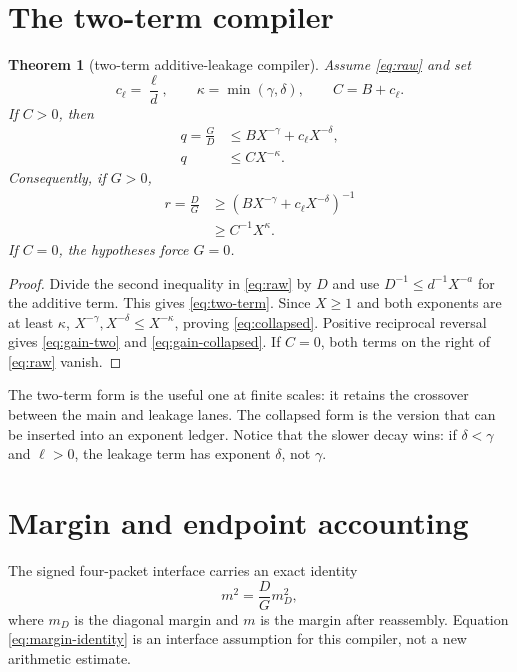 \documentclass[11pt]{article}
\newtheorem{theorem}{Theorem}
\begin{document}
\section{The two-term compiler}

\begin{theorem}[two-term additive-leakage compiler]
Assume \eqref{eq:raw} and set
\[
 c_\ell=\frac\ell d,\qquad \kappa=\min(\gamma,\delta),
 \qquad C=B+c_\ell.
\]
If $C>0$, then
\begin{align}
 q=\frac GD&\le B X^{-\gamma}+c_\ell X^{-\delta},
 \label{eq:two-term}\\
 q&\le C X^{-\kappa}.
 \label{eq:collapsed}
\end{align}
Consequently, if $G>0$,
\begin{align}
 r=\frac DG&\ge
 \left(B X^{-\gamma}+c_\ell X^{-\delta}\right)^{-1}
 \label{eq:gain-two}\\
 &\ge C^{-1}X^\kappa.
 \label{eq:gain-collapsed}
\end{align}
If $C=0$, the hypotheses force $G=0$.
\end{theorem}

\begin{proof}
Divide the second inequality in \eqref{eq:raw} by $D$ and use
$D^{-1}\le d^{-1}X^{-a}$ for the additive term.  This gives
\eqref{eq:two-term}.  Since $X\ge1$ and both exponents are at least
$\kappa$, $X^{-\gamma},X^{-\delta}\le X^{-\kappa}$, proving
\eqref{eq:collapsed}.  Positive reciprocal reversal gives
\eqref{eq:gain-two} and \eqref{eq:gain-collapsed}.  If $C=0$, both terms on
the right of \eqref{eq:raw} vanish.
\end{proof}

The two-term form is the useful one at finite scales: it retains the crossover
between the main and leakage lanes.  The collapsed form is the version that
can be inserted into an exponent ledger.  Notice that the slower decay wins:
if $\delta<\gamma$ and $\ell>0$, the leakage term has exponent $\delta$,
not $\gamma$.

\section{Margin and endpoint accounting}

The signed four-packet interface carries an exact identity
\begin{equation}
 m^2=\frac DG m_D^2,
 \label{eq:margin-identity}
\end{equation}
where $m_D$ is the diagonal margin and $m$ is the margin after reassembly.
Equation \eqref{eq:margin-identity} is an interface assumption for this
compiler, not a new arithmetic estimate.
\end{document}
